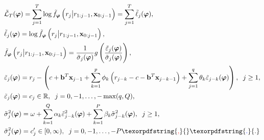 \documentclass[10pt,a4paper,oneside]{article}
\newcommand{\R}{\mathbb{R}}
\providecommand{\DIFaddtex}[1]{{\protect\color{blue} \sf #1}} %
\providecommand{\DIFdeltex}[1]{{\protect\color{red} \scriptsize #1}} %
\providecommand{\DIFaddbegin}{} %
\providecommand{\DIFaddend}{} %
\providecommand{\DIFdelbegin}{} %
\providecommand{\DIFdelend}{} %
\providecommand{\DIFadd}[1]{\texorpdfstring{\DIFaddtex{#1}}{#1}} %
\providecommand{\DIFdel}[1]{\texorpdfstring{\DIFdeltex{#1}}{}} %
\newcommand{\DIFscaledelfig}{0.5}
\newlength{\DIFdelgraphicswidth} %
\newlength{\DIFdelgraphicsheight} %
\newcommand{\DIFaddincludegraphics}[2][]{{\color{blue}\fbox{\DIFOincludegraphics[#1]{#2}}}} %
\newcommand{\DIFdelincludegraphics}[2][]{%
\sbox{\DIFdelgraphicsbox}{\DIFOincludegraphics[#1]{#2}}%
\settoboxwidth{\DIFdelgraphicswidth}{\DIFdelgraphicsbox} %
\settoboxtotalheight{\DIFdelgraphicsheight}{\DIFdelgraphicsbox} %
\scalebox{\DIFscaledelfig}{%
\parbox[b]{\DIFdelgraphicswidth}{\usebox{\DIFdelgraphicsbox}\\[-\baselineskip] \rule{\DIFdelgraphicswidth}{0em}}\llap{\resizebox{\DIFdelgraphicswidth}{\DIFdelgraphicsheight}{%
\setlength{\unitlength}{\DIFdelgraphicswidth}%
\begin{picture}(1,1)%
\thicklines\linethickness{2pt} %
{\color[rgb]{1,0,0}\put(0,0){\framebox(1,1){}}}%
{\color[rgb]{1,0,0}\put(0,0){\line( 1,1){1}}}%
{\color[rgb]{1,0,0}\put(0,1){\line(1,-1){1}}}%
\end{picture}%
}\hspace*{3pt}}} %
} %
\DeclareRobustCommand{\DIFaddbegin}{\DIFOaddbegin \let\includegraphics\DIFaddincludegraphics} %
\DeclareRobustCommand{\DIFaddend}{\DIFOaddend \let\includegraphics\DIFOincludegraphics} %
\DeclareRobustCommand{\DIFdelbegin}{\DIFOdelbegin \let\includegraphics\DIFdelincludegraphics} %
\DeclareRobustCommand{\DIFdelend}{\DIFOaddend \let\includegraphics\DIFOincludegraphics} %
\begin{document}
\begin{align*}
     & \tilde{\mathcal{L}}_{T}(\boldsymbol{\varphi}) = \sum^T_{j = 1} \log \tilde{f}_{\boldsymbol{\varphi}}\left(r_{j} \big | r_{1: j - 1}, \mathbf{x}_{0: j - 1} \right) = \sum^T_{j = 1} \tilde{\ell}_j(\boldsymbol{\varphi}),                                                                           \\
     & \tilde{\ell}_j(\boldsymbol{\varphi}) = \log \tilde{f}_{\boldsymbol{\varphi}}\left(r_{j} \big | r_{1: j - 1}, \mathbf{x}_{0 : j - 1} \right),                                                                                                                                                        \\
     & \tilde{f}_{\boldsymbol{\varphi}}\left(r_{j} \big | r_{1: j - 1}, \mathbf{x}_{0 : j - 1} \right) = \frac{1}{\tilde{\sigma}_j(\boldsymbol{\varphi})} g\left( \frac{\tilde{\varepsilon}_j(\boldsymbol{\varphi})}{\tilde{\sigma}_j(\boldsymbol{\varphi})} \right),                                      \\
     & \tilde{\varepsilon}_j(\boldsymbol{\varphi}) = r_j - \left(c +  \mathbf{b}^T \mathbf{x}_{j - 1} + \sum^p_{k = 1} \phi_k \left(r_{j - k} - c - \mathbf{b}^T \mathbf{x}_{j - k - 1}\right) + \sum^q_{j = 1} \theta_k \tilde{\varepsilon}_{j - k}(\boldsymbol{\varphi}) \right), \hspace{2mm} j \geq 1, \\
     & \tilde{\varepsilon}_j(\boldsymbol{\varphi}) = c_j \in \R, \hspace{2mm} j = 0, -1, \dots, - \max(q, Q), \\
     & \tilde{\sigma}^2_j(\boldsymbol{\varphi}) = \omega + \sum^Q_{k = 1} \alpha_k \tilde{\varepsilon}^2_{j - k}(\boldsymbol{\varphi}) + \sum^P_{k = 1} \beta_k \tilde{\sigma}^2_{j - k}(\boldsymbol{\varphi}), \hspace{2mm} j \geq 1,                                                                     \\
     & \tilde{\sigma}^2_j(\boldsymbol{\varphi}) = c'_j \in [0, \infty), \hspace{2mm} j = 0, -1, \dots, -P\DIFdelbegin \DIFdel{,
}\DIFdelend \DIFaddbegin \DIFadd{.
}\DIFaddend \end{align*}
\end{document}
